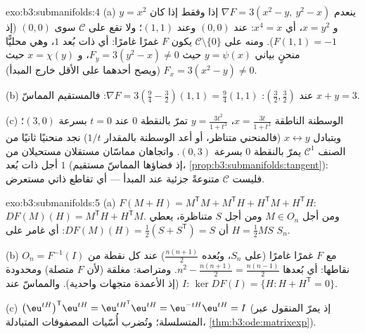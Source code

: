 \begin{solution}{exo:b3:submanifolds:4}
(a) ينعدم $\nabla F = 3(x^2 - y,\ y^2 - x)$ إذا وفقط إذا كان $y = x^2$ و $x = y^2$، أي
$x^4 = x$: عند $(0,0)$ وعند $(1,1)$؛ ولا تقع على $\mathcal C$
سوى $(0,0)$ (إذ $F(1,1) = -1$). ومنه على $\mathcal
C\setminus\{0\}$ يكون $F$ غمرًا
غامرًا: أي  ذات بُعد $1$، وهي محليًّا منحنٍ بياني
$y = \psi(x)$ حيث $F_y = 3(y^2 - x) \neq 0$، و $x = \chi(y)$ حيث $F_x = 3(x^2 - y) \neq 0$ (ويصح
أحدهما على الأقل خارج المبدأ).

(b) عند $(\frac32, \frac32)$: $\nabla F = 3(\frac94 - \frac32)
(1, 1) = \frac94(1,1)$: فالمستقيم المماسّ $x + y = 3$.

(c) الوسطنة الناطقة $x = \frac{3t}{1 + t^3}$، $y = \frac{3t^2}{1+t^3}$ تمرّ بالنقطة $0$ عند $t = 0$
بسرعة $(3, 0)$؛ وبتبادل $x \leftrightarrow y$ (فالمنحني متناظر، أو أعد الوسطنة
بالمقدار $1/t$) نجد منحنيًا ثانيًا من الصنف $\mathcal C^1$ يمرّ
بالنقطة $0$ بسرعة $(0, 3)$. واتجاهان مماسّان مستقلان مستحيلان
من أجل  ذات بُعد $1$ (إذ فضاؤها المماسّ مستقيم،
\cref{prop:b3:submanifolds:tangent}): فليست $\mathcal C$ متنوعةً جزئية عند المبدأ ---
أي تقاطع ذاتي مستعرض.
\end{solution}

\begin{solution}{exo:b3:submanifolds:5}
(a) $F(M + H) = M^{\mathsf T}M + M^{\mathsf T}H + H^{\mathsf
T}M + H^{\mathsf T}H$: $DF(M)(H) = M^{\mathsf T}H +
H^{\mathsf T}M$. ومن أجل $M \in O_n$ ومن أجل $S$ متناظرة،
يعطي $H =
\frac12MS$ أن $DF(M)(H) = \frac12(S + S^{\mathsf T}) = S$: أي غامر على $S_n$.

(b) $O_n = F^{-1}(I)$ مع $F$ غمرًا غامرًا (على $S_n$، وبُعده
$\frac{n(n+1)}2$) عند كل نقطة من نقاطها: أي  بُعدها
$n^2 - \frac{n(n+1)}2 =
\frac{n(n-1)}2$. ومتراصة: مغلقة (لأن $F$ متصلة) ومحدودة (إذ الأعمدة
متجهات واحدية). والمماسّ عند $I$: $\ker DF(I) =
\{H : H + H^{\mathsf T} = 0\}$.

(c) $\bigl(\eu^{tH}\bigr)^{\mathsf T}\eu^{tH} =
\eu^{tH^{\mathsf T}}\eu^{tH} = \eu^{-tH}\eu^{tH} = I$ (إذ يمرّ المنقول عبر المتسلسلة؛ وتُضرب أُسّيات
المصفوفات المتبادلة، \cref{thm:b3:ode:matrixexp}).
\end{solution}

